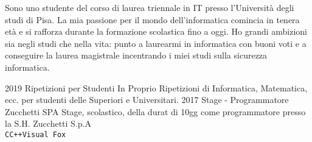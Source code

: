 \documentclass[9pt]{developercv} %
\begin{document}
\vspace{0.5cm}



\begin{minipage}[t]{0.4\textwidth} %
	\vspace{-\baselineskip} %

	Sono uno studente del corso di laurea triennale in IT presso l'Università degli studi di Pisa. La mia passione per il mondo dell'informatica
	comincia in tenera età e si rafforza durante la formazione scolastica fino a oggi.	Ho grandi ambizioni sia negli studi che nella vita: punto a laurearmi in informatica con buoni voti e a conseguire la laurea magistrale incentrando i miei studi
	sulla sicurezza informatica.\\
\end{minipage}
\hfill %
\begin{minipage}[t]{0.5\textwidth} %
	\vspace{-\baselineskip} %
\end{minipage}




\begin{entrylist}
	\entry
	{2019}
	{Ripetizioni per Studenti}
	{In Proprio}
	{Ripetizioni di Informatica, Matematica, ecc. per studenti delle Superiori e Universitari.}
	\entry
	{2017}
	{Stage - Programmatore}
	{Zucchetti SPA}
	{Stage, scolastico, della durat di 10gg come programmatore presso la S.H. Zucchetti S.p.A\\ \texttt{C}\slashsep\texttt{C++}\slashsep\texttt{Visual Fox}}
\end{entrylist}
\end{document}
